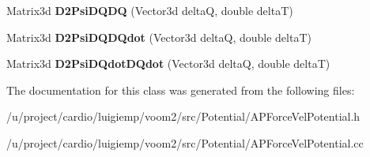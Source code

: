 \begin{DoxyCompactItemize}
\item 
\hypertarget{classvoom_1_1_a_p_force_vel_potential_abc09e482db34a739a857905c35b47105}{
Matrix3d {\bfseries D2PsiDQDQ} (Vector3d deltaQ, double deltaT)}
\label{classvoom_1_1_a_p_force_vel_potential_abc09e482db34a739a857905c35b47105}

\item 
\hypertarget{classvoom_1_1_a_p_force_vel_potential_a23d7355ee315327fd23d65cfe679868a}{
Matrix3d {\bfseries D2PsiDQDQdot} (Vector3d deltaQ, double deltaT)}
\label{classvoom_1_1_a_p_force_vel_potential_a23d7355ee315327fd23d65cfe679868a}

\item 
\hypertarget{classvoom_1_1_a_p_force_vel_potential_a159b874e9fb31815e0f842f28eb40e2b}{
Matrix3d {\bfseries D2PsiDQdotDQdot} (Vector3d deltaQ, double deltaT)}
\label{classvoom_1_1_a_p_force_vel_potential_a159b874e9fb31815e0f842f28eb40e2b}

\end{DoxyCompactItemize}


The documentation for this class was generated from the following files:\begin{DoxyCompactItemize}
\item 
/u/project/cardio/luigiemp/voom2/src/Potential/APForceVelPotential.h\item 
/u/project/cardio/luigiemp/voom2/src/Potential/APForceVelPotential.cc\end{DoxyCompactItemize}
